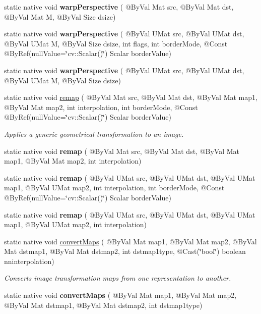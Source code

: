 \begin{DoxyCompactItemize}
static native void {\bfseries warp\+Perspective} ( @By\+Val Mat src, @By\+Val Mat dst, @By\+Val Mat M, @By\+Val Size dsize)
\item 
static native void {\bfseries warp\+Perspective} ( @By\+Val U\+Mat src, @By\+Val U\+Mat dst, @By\+Val U\+Mat M, @By\+Val Size dsize, int flags, int border\+Mode, @Const @By\+Ref(null\+Value=\char`\"{}cv\+::\+Scalar()\char`\"{}) Scalar border\+Value)
\item 
static native void {\bfseries warp\+Perspective} ( @By\+Val U\+Mat src, @By\+Val U\+Mat dst, @By\+Val U\+Mat M, @By\+Val Size dsize)
\item 
static native void \hyperlink{group__imgproc__transform_gaa9d03105d426e5424af34452bee91554}{remap} ( @By\+Val Mat src, @By\+Val Mat dst, @By\+Val Mat map1, @By\+Val Mat map2, int interpolation, int border\+Mode, @Const @By\+Ref(null\+Value=\char`\"{}cv\+::\+Scalar()\char`\"{}) Scalar border\+Value)
\begin{DoxyCompactList}\small\item\em Applies a generic geometrical transformation to an image. \end{DoxyCompactList}\item 
static native void {\bfseries remap} ( @By\+Val Mat src, @By\+Val Mat dst, @By\+Val Mat map1, @By\+Val Mat map2, int interpolation)
\item 
static native void {\bfseries remap} ( @By\+Val U\+Mat src, @By\+Val U\+Mat dst, @By\+Val U\+Mat map1, @By\+Val U\+Mat map2, int interpolation, int border\+Mode, @Const @By\+Ref(null\+Value=\char`\"{}cv\+::\+Scalar()\char`\"{}) Scalar border\+Value)
\item 
static native void {\bfseries remap} ( @By\+Val U\+Mat src, @By\+Val U\+Mat dst, @By\+Val U\+Mat map1, @By\+Val U\+Mat map2, int interpolation)
\item 
static native void \hyperlink{group__imgproc__transform_ga5c40c7a1051387a05e1e30b6aaa6dbfd}{convert\+Maps} ( @By\+Val Mat map1, @By\+Val Mat map2, @By\+Val Mat dstmap1, @By\+Val Mat dstmap2, int dstmap1type, @Cast(\char`\"{}bool\char`\"{}) boolean nninterpolation)
\begin{DoxyCompactList}\small\item\em Converts image transformation maps from one representation to another. \end{DoxyCompactList}\item 
static native void {\bfseries convert\+Maps} ( @By\+Val Mat map1, @By\+Val Mat map2, @By\+Val Mat dstmap1, @By\+Val Mat dstmap2, int dstmap1type)

\end{DoxyCompactItemize}
